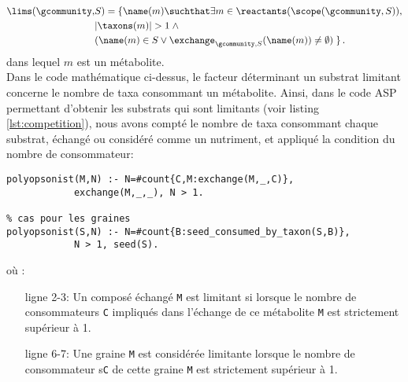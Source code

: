 \documentclass[../main.tex]{subfiles}
\begin{document}
\begin{align}
	\begin{split}
	\lims(\gcommunity,& S) = \{ \name(m) \suchthat
     	\exists m\in \reactants(\scope(\gcommunity, S)), \\
    	& \vert \taxons(m) \vert > 1 \;\wedge \\
    	& (\name(m) \in S \vee 
      	\exchange_{\gcommunity,S}(\name(m)) \neq\emptyset) \;\} \, . \\
	\end{split}
\end{align}
dans lequel $m$ est un métabolite. \\
%
%

Dans le code mathématique ci-dessus, le facteur déterminant un substrat limitant concerne le nombre de taxa consommant un métabolite. Ainsi, dans le code ASP permettant d'obtenir les substrats qui sont limitants (voir listing \ref{lst:competition}), nous avons compté le nombre de taxa consommant chaque substrat, échangé ou considéré comme un nutriment, et appliqué la condition du nombre de consommateur:

\begin{lstlisting}[mathescape=True,label={lst:competition}, caption={Code ASP permettant d'obtenir l'ensemble des consommateurs en compétition pour un substrat limitant.}, captionpos=b]
% cas pour les metabolites echangeables
polyopsonist(M,N) :- N=#count{C,M:exchange(M,_,C)},
		 	exchange(M,_,_), N > 1.
		 	
% cas pour les graines
polyopsonist(S,N) :- N=#count{B:seed_consumed_by_taxon(S,B)}, 
			N > 1, seed(S).
\end{lstlisting}

où :

\begin{itemize}
	\item[ligne 2-3:] Un composé échangé \texttt{M} est limitant si lorsque le nombre de consommateurs \texttt{C} impliqués dans l'échange de ce métabolite \texttt{M} est strictement supérieur à 1.
	\item[ligne 6-7:] Une graine \texttt{M} est considérée limitante lorsque le nombre de consommateur s\texttt{C} de cette graine \texttt{M} est strictement supérieur à 1. \\
\end{itemize}
\end{document}
